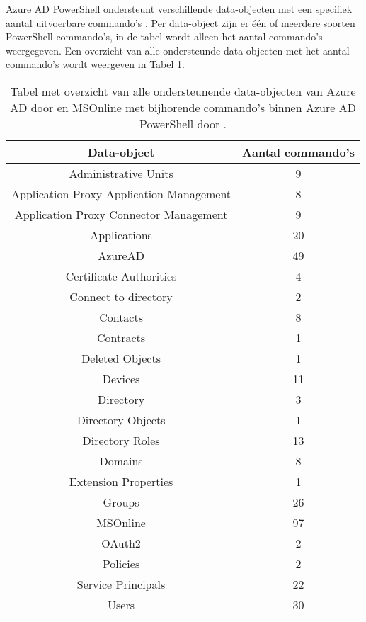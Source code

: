 Azure AD PowerShell ondersteunt verschillende data-objecten met een specifiek aantal uitvoerbare commando's \autocite{Microsoft2023i}. Per data-object zijn er één of meerdere soorten PowerShell-commando's, in de tabel wordt alleen het aantal commando's weergegeven. Een overzicht van alle ondersteunde data-objecten met het aantal commando's wordt weergeven in Tabel \ref{AADT}. 

\begin{table}
    \small
    \centering
    \begin{tabular}{ |c|c| } 
        \hline
        \textbf{Data-object} & \textbf{Aantal commando's} \\
        \hline
        Administrative Units & 9 \\ 
        Application Proxy Application Management & 8 \\ 
        Application Proxy Connector Management & 9 \\
        Applications & 20 \\ 
        AzureAD & 49 \\ 
        Certificate Authorities & 4 \\ 
        Connect to directory & 2 \\ 
        Contacts & 8 \\ 
        Contracts & 1 \\ 
        Deleted Objects & 1 \\ 
        Devices & 11 \\    
        Directory & 3 \\
        Directory Objects & 1 \\ 
        Directory Roles & 13 \\ 
        Domains & 8 \\ 
        Extension Properties & 1 \\ 
        Groups & 26 \\ 
        MSOnline & 97 \\
        OAuth2 & 2 \\ 
        Policies & 2 \\ 
        Service Principals & 22 \\ 
        Users & 30 \\ 
        \hline
    \end{tabular}
    \caption[Tabel Azure AD en MSonline data-objecten]{Tabel met overzicht van alle ondersteunende data-objecten van Azure \ac{AD} door \textcite{Microsoft2023i} en MSOnline met bijhorende commando's binnen Azure \ac{AD} PowerShell door \textcite{Microsofta}.}
    \label{AADT}
\end{table}

